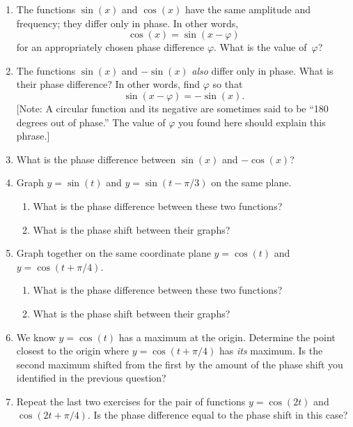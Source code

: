 \begin{enumerate}
\item The functions $\sin(x)$ and $\cos(x)$ have the same amplitude and
frequency; they differ only in phase.  In other words,
\[
\cos(x) = \sin(x - \varphi)
\]
for an appropriately chosen phase difference $\varphi$.  What is the
value of~$\varphi$?


\item The functions $\sin(x)$ and $-\sin(x)$ {\em also\/} differ only
in phase.  What is their phase difference?  In other words, find
$\varphi$ so that
	\[
\sin(x - \varphi) = -\sin(x).
\]
[Note: A circular function and its negative are sometimes said to be
  ``180 degrees out of phase.''  The value of $\varphi$ you found here
  should explain this phrase.]


\item What is the phase difference between $\sin(x)$ and $-\cos(x)$?


\item Graph $y = \sin(t)$ and $y = \sin(t - \pi/3)$ on the same plane.

  \begin{enumerate}
  \item What is the phase difference between these two functions?

  \item What is the phase shift between their graphs?



\end{enumerate}
\item Graph together on the same coordinate plane $y = \cos(t)$ and $y
= \cos(t + \pi/4)$.

  \begin{enumerate}
  \item What is the phase difference between these two functions?

  \item What is the phase shift between their graphs?


\end{enumerate}
\item We know $y = \cos(t)$ has a maximum at the origin.  Determine the
point closest to the origin where $y = \cos(t + \pi/4)$ has {\em
  its\/} maximum.  Is the second maximum shifted from the first by the
amount of the phase shift you identified in the previous question?


\item Repeat the last two exercises for the pair of functions $y =
\cos(2t)$ and $\cos(2t + \pi/4)$.  Is the phase difference equal to
the phase shift in this case?



\end{enumerate}
